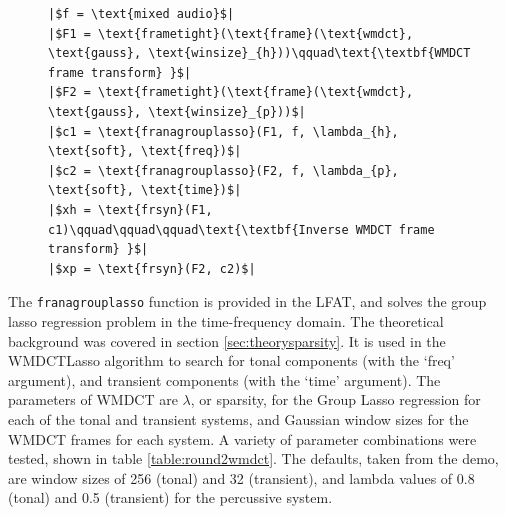 \documentclass[letter,12pt]{article}
\newlength{\mintednumbersep}
\begin{document}
\begin{figure}[h]
  \centering
  \centering
\begin{verbatim}
|$f = \text{mixed audio}$|
|$F1 = \text{frametight}(\text{frame}(\text{wmdct}, \text{gauss}, \text{winsize}_{h}))\qquad\text{\textbf{WMDCT frame transform} }$|
|$F2 = \text{frametight}(\text{frame}(\text{wmdct}, \text{gauss}, \text{winsize}_{p}))$|
|$c1 = \text{franagrouplasso}(F1, f, \lambda_{h}, \text{soft}, \text{freq})$|
|$c2 = \text{franagrouplasso}(F2, f, \lambda_{p}, \text{soft}, \text{time})$|
|$xh = \text{frsyn}(F1, c1)\qquad\qquad\qquad\text{\textbf{Inverse WMDCT frame transform} }$|
|$xp = \text{frsyn}(F2, c2)$|
\end{verbatim}
  \label{lst:wmdctlasso}
\end{figure}

The \Verb#franagrouplasso# function is provided in the LFAT, and solves the group lasso regression problem in the time-frequency domain. The theoretical background was covered in section \ref{sec:theorysparsity}. It is used in the WMDCTLasso algorithm to search for tonal components (with the `freq' argument), and transient components (with the `time' argument). The parameters of WMDCT are $\lambda$, or sparsity, for the Group Lasso regression for each of the tonal and transient systems, and Gaussian window sizes for the WMDCT frames for each system. A variety of parameter combinations were tested, shown in table \ref{table:round2wmdct}. The defaults, taken from the demo, are window sizes of 256 (tonal) and 32 (transient), and lambda values of 0.8 (tonal) and 0.5 (transient) for the percussive system.
\end{document}
